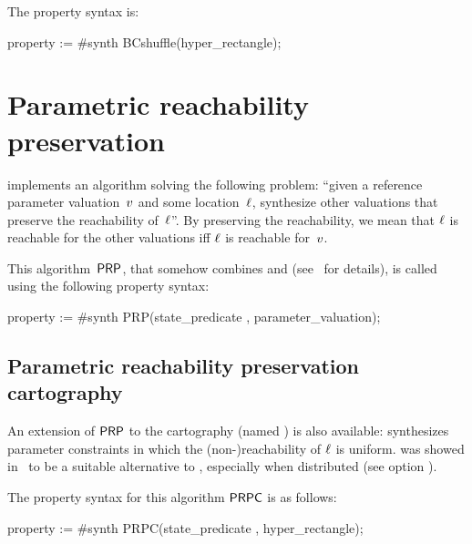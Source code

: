 The property syntax is:

\begin{IMITATORproperty}
property := #synth BCshuffle(hyper_rectangle);
\end{IMITATORproperty}



\section{Parametric reachability preservation}\label{section:algorithm:PRP}

\imitator{} implements an algorithm solving the following problem:
``given a reference parameter valuation~$v$ and some location~$\ell$, synthesize other valuations that preserve the reachability of~$\ell$''.
By preserving the reachability, we mean that $\ell$ is reachable for the other valuations iff $\ell$ is reachable for~$v$.

This algorithm~$\mathsf{PRP}$, that somehow combines \EFsynth{} and \IM{} (see~\cite{ALNS15} for details), is called using the following property syntax:

\begin{IMITATORproperty}
property := #synth PRP(state_predicate , parameter_valuation);
\end{IMITATORproperty}



\subsection*{Parametric reachability preservation cartography}\label{section:algorithm:PRPC}

An extension of $\mathsf{PRP}$ to the cartography (named \PRPC{}) is also available: \PRPC{} synthesizes parameter constraints in which the (non-)reachability of $\ell$ is uniform.
\PRPC{} was showed in~\cite{ALNS15} to be a suitable alternative to \EFsynth{}, especially when distributed (see option ).

The property syntax for this algorithm $\mathsf{PRPC}$ is as follows:

\begin{IMITATORproperty}
property := #synth PRPC(state_predicate , hyper_rectangle);
\end{IMITATORproperty}



